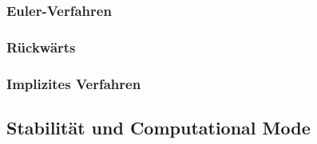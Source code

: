 \subsubsection{Euler-Verfahren}

\subsubsection{Rückwärts}

\subsubsection{Implizites Verfahren}

%
%
\subsection{Stabilität und Computational Mode
\label{pde:subsection:stabilitaet}}






